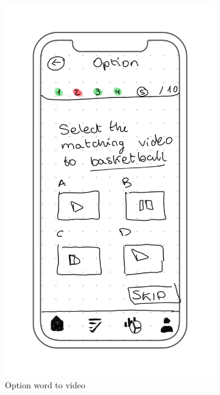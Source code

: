 \begin{figure}[H]
\begin{subfigure}[T]{0.24\textwidth}
        \includegraphics[width=\textwidth]{assets/screens/quiz/Quiz - Option 2.png}
        \caption{Option word to video}
        \label{fig:design_screen_mimic}
    \end{subfigure}
    \begin{subfigure}[T]{0.24\textwidth}
        \centering

\end{subfigure}
\end{figure}
